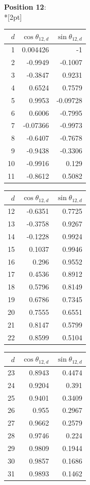 \noindent \textbf{Position 12}:\\*[2pt]
{\tablefont \begin{tabular}[t]{r|rr}
$d$ & $\cos\theta_{12,d}$ & $\sin\theta_{12,d}$ \\\hline
1 & 0.004426 & -1 \\
2 & -0.9949 & -0.1007 \\
3 & -0.3847 & 0.9231 \\
4 & 0.6524 & 0.7579 \\
5 & 0.9953 & -0.09728 \\
6 & 0.6006 & -0.7995 \\
7 & -0.07366 & -0.9973 \\
8 & -0.6407 & -0.7678 \\
9 & -0.9438 & -0.3306 \\
10 & -0.9916 & 0.129 \\
11 & -0.8612 & 0.5082
\end{tabular}\kern4pt
\begin{tabular}[t]{r|rr}
$d$ & $\cos\theta_{12,d}$ & $\sin\theta_{12,d}$ \\\hline
12 & -0.6351 & 0.7725 \\
13 & -0.3758 & 0.9267 \\
14 & -0.1228 & 0.9924 \\
15 & 0.1037 & 0.9946 \\
16 & 0.296 & 0.9552 \\
17 & 0.4536 & 0.8912 \\
18 & 0.5796 & 0.8149 \\
19 & 0.6786 & 0.7345 \\
20 & 0.7555 & 0.6551 \\
21 & 0.8147 & 0.5799 \\
22 & 0.8599 & 0.5104
\end{tabular}\kern4pt
\begin{tabular}[t]{r|rr}
$d$ & $\cos\theta_{12,d}$ & $\sin\theta_{12,d}$ \\\hline
23 & 0.8943 & 0.4474 \\
24 & 0.9204 & 0.391 \\
25 & 0.9401 & 0.3409 \\
26 & 0.955 & 0.2967 \\
27 & 0.9662 & 0.2579 \\
28 & 0.9746 & 0.224 \\
29 & 0.9809 & 0.1944 \\
30 & 0.9857 & 0.1686 \\
31 & 0.9893 & 0.1462 \\

\end{tabular}}
